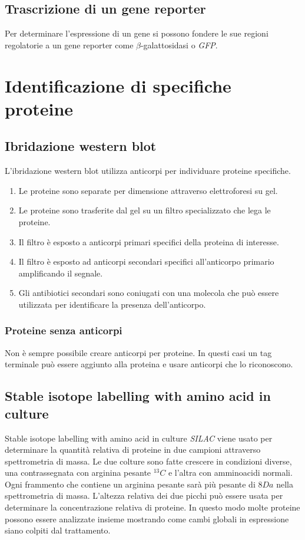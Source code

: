 	\subsection{Trascrizione di un gene reporter}
	Per determinare l'espressione di un gene si possono fondere le sue regioni regolatorie a un gene reporter come $\beta$-galattosidasi o \emph{GFP}.

\section{Identificazione di specifiche proteine}

	\subsection{Ibridazione western blot}
	L'ibridazione western blot utilizza anticorpi per individuare proteine specifiche.
	\begin{multicols}{2}
		\begin{enumerate}
			\item Le proteine sono separate per dimensione attraverso elettroforesi su gel.
			\item Le proteine sono trasferite dal gel su un filtro specializzato che lega le proteine.
			\item Il filtro \`e esposto a anticorpi primari specifici della proteina di interesse.
			\item Il filtro \`e esposto ad anticorpi secondari specifici all'anticorpo primario amplificando il segnale.
			\item Gli antibiotici secondari sono coniugati con una molecola che pu\`o essere utilizzata per identificare la presenza dell'anticorpo.
		\end{enumerate}
	\end{multicols}

		\subsubsection{Proteine senza anticorpi}
		Non \`e sempre possibile creare anticorpi per proteine.
		In questi casi un tag terminale pu\`o essere aggiunto alla proteina e usare anticorpi che lo riconoscono.

	\subsection{Stable isotope labelling with amino acid in culture}
	Stable isotope labelling with amino acid in culture \emph{SILAC} viene usato per determinare la quantit\`a relativa di proteine in due campioni attraverso spettrometria di massa.
	Le due colture sono fatte crescere in condizioni diverse, una contrassegnata con arginina pesante \emph{$^{13}C$} e l'altra con amminoacidi normali.
	Ogni frammento che contiene un arginina pesante sar\`a pi\`u pesante di $8Da$ nella spettrometria di massa.
	L'altezza relativa dei due picchi pu\`o essere usata per determinare la concentrazione relativa di proteine.
	In questo modo molte proteine possono essere analizzate insieme mostrando come cambi globali in espressione siano colpiti dal trattamento.

